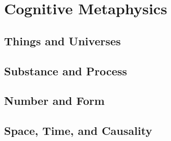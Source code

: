 \toclineskip
\section{Cognitive Metaphysics}

\subsection{Things and Universes}

\subsection{Substance and Process}

\subsection{Number and Form}

\subsection{Space, Time, and Causality}

